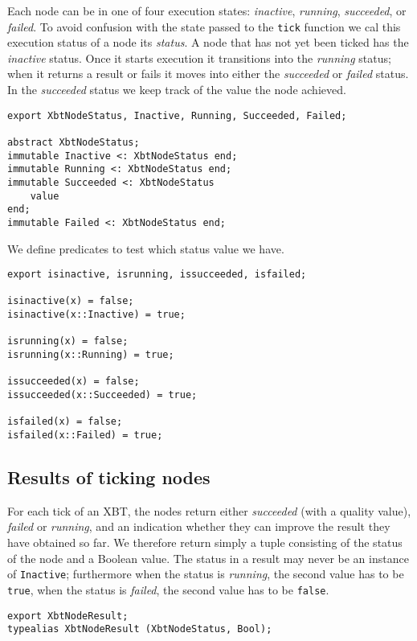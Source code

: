 \documentclass[a4wide]{article}
\begin{document}
Each node can be in one of four execution states: \emph{inactive},
\emph{running}, \emph{succeeded}, or \emph{failed}.  To avoid confusion with the
state passed to the \verb~tick~ function we cal this execution status of
a node its \emph{status}.  A node that has not yet been ticked has the
\emph{inactive} status.  Once it starts execution it transitions into the
\emph{running} status; when it returns a result or fails it moves into
either the \emph{succeeded} or \emph{failed} status.  In the \emph{succeeded}
status we keep track of the value the node achieved.

\begin{verbatim}
export XbtNodeStatus, Inactive, Running, Succeeded, Failed;

abstract XbtNodeStatus;
immutable Inactive <: XbtNodeStatus end;
immutable Running <: XbtNodeStatus end;
immutable Succeeded <: XbtNodeStatus
    value
end;
immutable Failed <: XbtNodeStatus end;
\end{verbatim}

We define predicates to test which status value we have.

\begin{verbatim}
export isinactive, isrunning, issucceeded, isfailed;

isinactive(x) = false;
isinactive(x::Inactive) = true;

isrunning(x) = false;
isrunning(x::Running) = true;

issucceeded(x) = false;
issucceeded(x::Succeeded) = true;

isfailed(x) = false;
isfailed(x::Failed) = true;
\end{verbatim}

\subsection{Results of ticking nodes}
\label{sec-3-2}

For each tick of an XBT, the nodes return either \emph{succeeded} (with
a quality value), \emph{failed} or \emph{running}, and an indication whether
they can improve the result they have obtained so far.  We
therefore return simply a tuple consisting of the status of the
node and a Boolean value.  The status in a result may never be an
instance of \verb~Inactive~; furthermore when the status is \emph{running}, the
second value has to be \verb~true~, when the status is \emph{failed}, the
second value has to be \verb~false~.

\begin{verbatim}
export XbtNodeResult;
typealias XbtNodeResult (XbtNodeStatus, Bool);
\end{verbatim}
\end{document}
